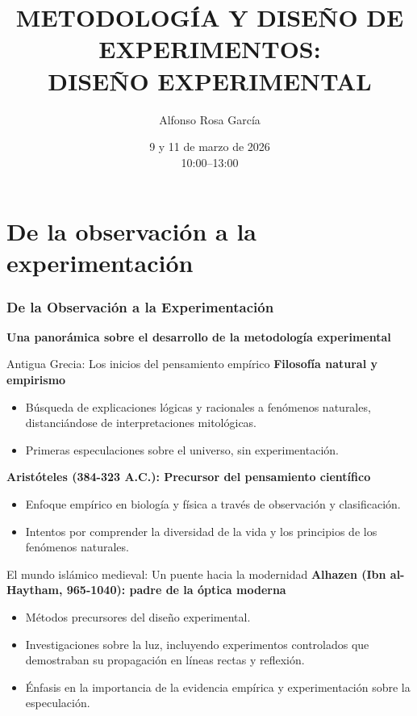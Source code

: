 ﻿\documentclass{beamer}
\title[DISEÑO DE EXPERIMENTOS]{METODOLOGÍA Y DISEÑO DE EXPERIMENTOS: \\  DISEÑO EXPERIMENTAL}
\author[Alfonso Rosa García]{Alfonso Rosa García }
\institute[G9]{\textbf{Grupo de Universidades G-9}}
\date{9 y 11 de marzo de 2026 \\ 10:00--13:00}
\begin{document}
\begin{frame}
  \titlepage
\end{frame}


\section{De la observación a la experimentación}

\begin{frame}
    \frametitle{De la Observación a la Experimentación}
    \centering
    \textbf{\Large Una panorámica sobre el desarrollo de la metodología experimental}
    \vspace{0.5cm}
\end{frame}

\begin{frame}{Antigua Grecia: Los inicios del pensamiento empírico}
    \textbf{Filosofía natural y empirismo}
    \begin{itemize}
        \item Búsqueda de explicaciones lógicas y racionales a fenómenos naturales, distanciándose de interpretaciones mitológicas.
        \item Primeras especulaciones sobre el universo, sin experimentación.
    \end{itemize}
  
    \textbf{Aristóteles (384-323 A.C.): Precursor del pensamiento científico}
    \begin{itemize}
        \item Enfoque empírico en biología y física a través de observación y clasificación.
        \item Intentos por comprender la diversidad de la vida y los principios de los fenómenos naturales.
    \end{itemize}
\end{frame}

\begin{frame}{El mundo islámico medieval: Un puente hacia la modernidad}
    \textbf{Alhazen (Ibn al-Haytham, 965-1040): padre de la óptica moderna}
    \begin{itemize}
        \item Métodos precursores del diseño experimental.
        \item Investigaciones sobre la luz, incluyendo experimentos controlados que demostraban su propagación en líneas rectas y reflexión.
        \item Énfasis en la importancia de la evidencia empírica y experimentación sobre la especulación.
    \end{itemize}
    \end{frame}
\end{document}
